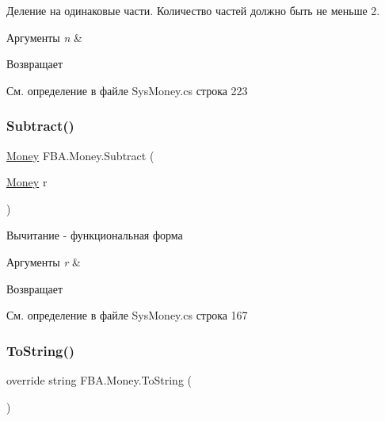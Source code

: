 Деление на одинаковые части. Количество частей должно быть не меньше 2. 


\begin{DoxyParams}{Аргументы}
{\em n} & \\
\hline
\end{DoxyParams}
\begin{DoxyReturn}{Возвращает}

\end{DoxyReturn}


См. определение в файле Sys\+Money.\+cs строка 223

\mbox{\label{struct_f_b_a_1_1_money_a14ede4348ed7b119c195073a1e30ae11}} 
\subsubsection{\texorpdfstring{Subtract()}{Subtract()}}
{\footnotesize\ttfamily \mbox{\hyperlink{struct_f_b_a_1_1_money}{Money}} F\+B\+A.\+Money.\+Subtract (\begin{DoxyParamCaption}\item[{\mbox{\hyperlink{struct_f_b_a_1_1_money}{Money}}}]{r }\end{DoxyParamCaption})}



Вычитание -\/ функциональная форма 


\begin{DoxyParams}{Аргументы}
{\em r} & \\
\hline
\end{DoxyParams}
\begin{DoxyReturn}{Возвращает}

\end{DoxyReturn}


См. определение в файле Sys\+Money.\+cs строка 167

\mbox{\label{struct_f_b_a_1_1_money_ab9c812a1c7ddd8496bbea4192f1e8ce2}} 
\subsubsection{\texorpdfstring{To\+String()}{ToString()}\hspace{0.1cm}{\footnotesize\ttfamily [1/4]}}
{\footnotesize\ttfamily override string F\+B\+A.\+Money.\+To\+String (\begin{DoxyParamCaption}{ }\end{DoxyParamCaption})}



